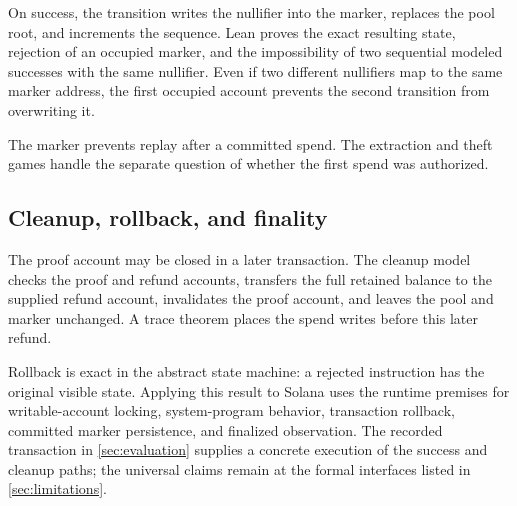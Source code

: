 On success, the transition writes the nullifier into the marker, replaces the
pool root, and increments the sequence.  Lean proves the exact resulting
state, rejection of an occupied marker, and the impossibility of two
sequential modeled successes with the same nullifier.  Even if two different
nullifiers map to the same marker address, the first occupied account prevents
the second transition from overwriting it.

The marker prevents replay after a committed spend.  The extraction and theft
games handle the separate question of whether the first spend was authorized.

\subsection{Cleanup, rollback, and finality}

The proof account may be closed in a later transaction.  The cleanup model
checks the proof and refund accounts, transfers the full retained balance to
the supplied refund account, invalidates the proof account, and leaves the
pool and marker unchanged.  A trace theorem places the spend writes before
this later refund.

Rollback is exact in the abstract state machine: a rejected instruction has
the original visible state.  Applying this result to Solana uses the runtime
premises for writable-account locking, system-program behavior, transaction
rollback, committed marker persistence, and finalized observation.  The
recorded transaction in \cref{sec:evaluation} supplies a concrete execution
of the success and cleanup paths; the universal claims remain at the formal
interfaces listed in \cref{sec:limitations}.
